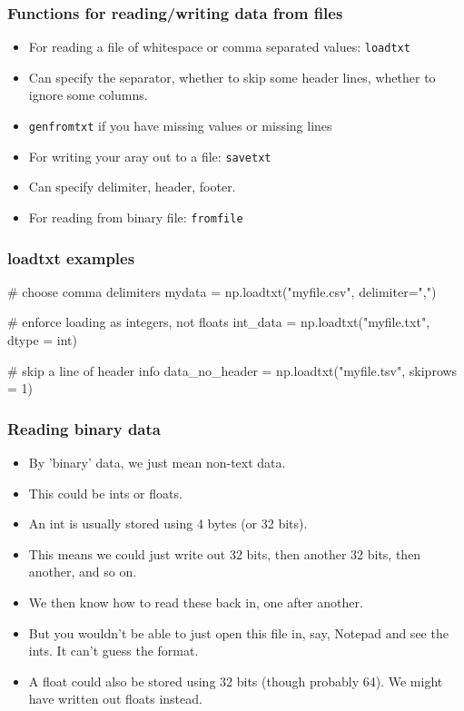 \documentclass{beamer}
\begin{document}
\begin{frame}[fragile]
\frametitle{Functions for reading/writing data from files}
\begin{itemize}
\item For reading a file of whitespace or comma separated values: \texttt{loadtxt}
\item Can specify the separator, whether to skip some header lines,
  whether to ignore some columns.
\item \texttt{genfromtxt} if you have missing values or missing lines
\item For writing your aray out to a file: \texttt{savetxt}
\item Can specify delimiter, header, footer.
\item For reading from binary file: \texttt{fromfile}
\end{itemize}
\end{frame}

\begin{frame}[fragile]
\frametitle{loadtxt examples}
\begin{code}
# choose comma delimiters
mydata = np.loadtxt("myfile.csv", delimiter=",")

# enforce loading as integers, not floats
int_data = np.loadtxt("myfile.txt", dtype = int)

# skip a line of header info
data_no_header = np.loadtxt("myfile.tsv", skiprows = 1)
\end{code}
\end{frame}

\begin{frame}[fragile]
\frametitle{Reading binary data}
\begin{itemize}
\item By 'binary' data, we just mean non-text data. 
\item This could be ints or floats.
\item An int is usually stored using 4 bytes (or 32 bits).
\item This means we could just write out 32 bits, then another 32
  bits, then another, and so on.
\item We then know how to read these back in, one after another.
\item But you wouldn't be able to just open this file in, say, Notepad and see
  the ints. It can't guess the format.
\item A float could also be stored using 32 bits (though probably
  64). We might have written out floats instead.
\end{itemize}
\end{frame}
\end{document}
